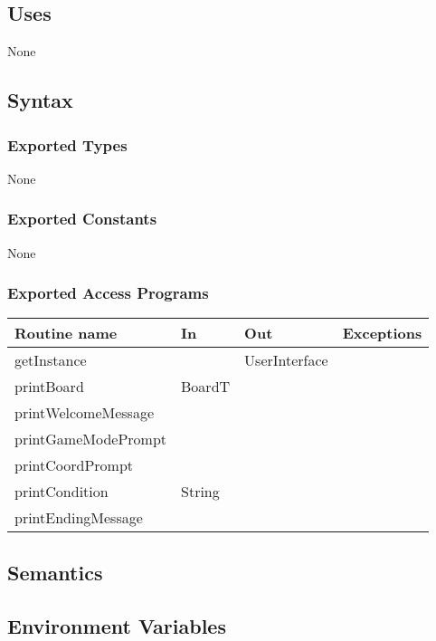 \documentclass[12pt]{article}
\begin{document}
\subsection* {Uses}

None

\subsection* {Syntax}

\subsubsection* {Exported Types}

None

\subsubsection* {Exported Constants}

None

\subsubsection* {Exported Access Programs}

\begin{tabular}{| l | l | l | p{6cm} |}
\hline
\textbf{Routine name} & \textbf{In} & \textbf{Out} & \textbf{Exceptions}\\
\hline
getInstance & ~ & UserInterface &  \\
\hline
printBoard & BoardT & ~ & \\
\hline
printWelcomeMessage & ~ & ~ & \\
\hline
printGameModePrompt & ~ & ~ & \\
\hline
printCoordPrompt & ~ & ~ & \\
\hline
printCondition & String & ~ & \\
\hline
printEndingMessage & ~ & ~ & \\
\hline
\end{tabular}

\subsection* {Semantics}

\subsection*{Environment Variables}
\end{document}
